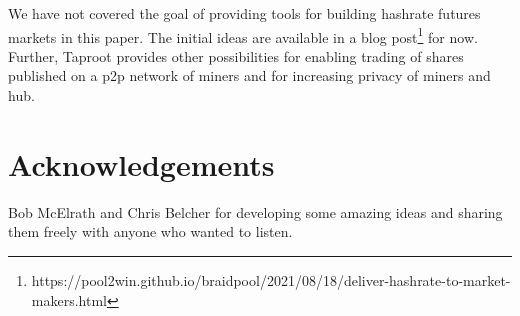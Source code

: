 \documentclass{article}
\begin{document}
We have not covered the goal of providing tools for building hashrate
futures markets in this paper. The initial ideas are available in a
blog
post\footnote{https://pool2win.github.io/braidpool/2021/08/18/deliver-hashrate-to-market-makers.html}
for now. Further, Taproot provides other possibilities for enabling
trading of shares published on a p2p network of miners and for
increasing privacy of miners and hub.






\section{Acknowledgements}

Bob McElrath and Chris Belcher for developing some amazing ideas and
sharing them freely with anyone who wanted to listen.

 

\end{document}
